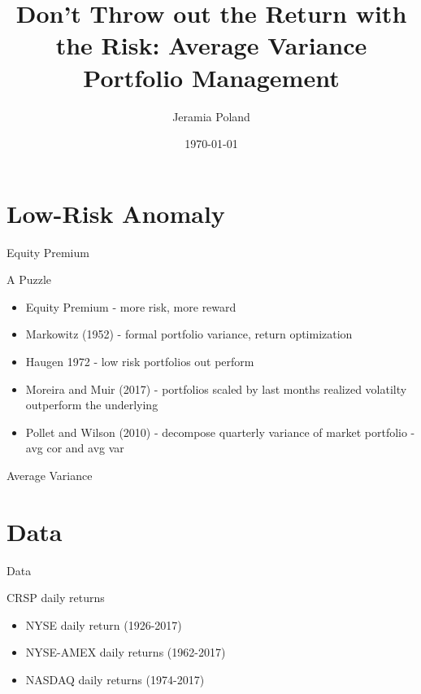 \documentclass{beamer}
\begin{document}
\title[Average Variance]{Don't Throw out the Return with the Risk: Average Variance Portfolio Management}   
\author[J. Poland]{Jeramia Poland} 
\date{\today}

\begin{frame}
\titlepage
\end{frame}

\section{Low-Risk Anomaly}

\begin{frame}{Equity Premium}
	\begin{block}{A Puzzle}
\begin{itemize}
	\item Equity Premium - more risk, more reward
	\item Markowitz (1952) - formal portfolio variance, return optimization
	\item Haugen 1972 - low risk portfolios out perform
	\item Moreira and Muir (2017) - portfolios scaled by last months realized volatilty outperform the underlying
	\item Pollet and Wilson (2010) - decompose quarterly variance of market portfolio - avg cor and avg var
\end{itemize}
	\end{block}
\end{frame}

\begin{frame}{Average Variance}
	\begin{adjustbox}{width=\textwidth}
		
	\end{adjustbox}
	\begin{adjustbox}{width=\textwidth}
			
	\end{adjustbox}
\end{frame}

\section{Data}

\begin{frame}{Data}
	\begin{block}{CRSP daily returns}
		\begin{itemize}
			\item NYSE daily return (1926-2017)
			\item NYSE-AMEX daily returns (1962-2017)
			\item NASDAQ daily returns (1974-2017)
		\end{itemize}
	\end{block}
\end{frame}
\end{document}
